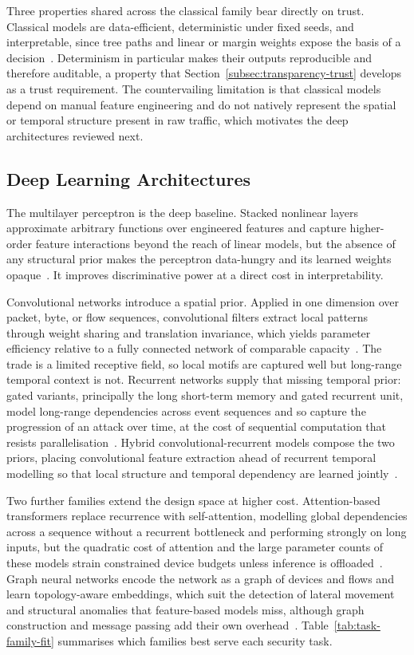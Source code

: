 Three properties shared across the classical family bear directly on trust.
Classical models are data-efficient, deterministic under fixed seeds, and
interpretable, since tree paths and linear or margin weights expose the basis of
a decision~\cite{abdelaziz2025enhancing}. Determinism in particular makes their
outputs reproducible and therefore auditable, a property that
Section~\ref{subsec:transparency-trust} develops as a trust requirement. The
countervailing limitation is that classical models depend on manual feature
engineering and do not natively represent the spatial or temporal structure
present in raw traffic, which motivates the deep architectures reviewed next.

\subsection{Deep Learning Architectures}
\label{subsec:deep-learning}

The multilayer perceptron is the deep baseline. Stacked nonlinear layers
approximate arbitrary functions over engineered features and capture
higher-order feature interactions beyond the reach of linear models, but the
absence of any structural prior makes the perceptron data-hungry and its learned
weights opaque~\cite{cherfi2025mlp, zhao2025research}. It improves
discriminative power at a direct cost in interpretability.

Convolutional networks introduce a spatial prior. Applied in one dimension over
packet, byte, or flow sequences, convolutional filters extract local patterns
through weight sharing and translation invariance, which yields parameter
efficiency relative to a fully connected network of comparable
capacity~\cite{kumar2024deep}. The trade is a limited receptive field, so local
motifs are captured well but long-range temporal context is not. Recurrent
networks supply that missing temporal prior: gated variants, principally the
long short-term memory and gated recurrent unit, model long-range dependencies
across event sequences and so capture the progression of an attack over time,
at the cost of sequential computation that resists
parallelisation~\cite{devendiran2024dugat}. Hybrid convolutional-recurrent
models compose the two priors, placing convolutional feature extraction ahead of
recurrent temporal modelling so that local structure and temporal dependency are
learned jointly~\cite{psychogyios2024deep}.

Two further families extend the design space at higher cost. Attention-based
transformers replace recurrence with self-attention, modelling global
dependencies across a sequence without a recurrent bottleneck and performing
strongly on long inputs, but the quadratic cost of attention and the large
parameter counts of these models strain constrained device budgets unless
inference is offloaded~\cite{ali2024empowering}. Graph neural networks encode the
network as a graph of devices and flows and learn topology-aware embeddings,
which suit the detection of lateral movement and structural anomalies that
feature-based models miss, although graph construction and message passing add
their own overhead~\cite{xu2024applying, zhong2024survey}.
Table~\ref{tab:task-family-fit} summarises which families best serve each
security task.

